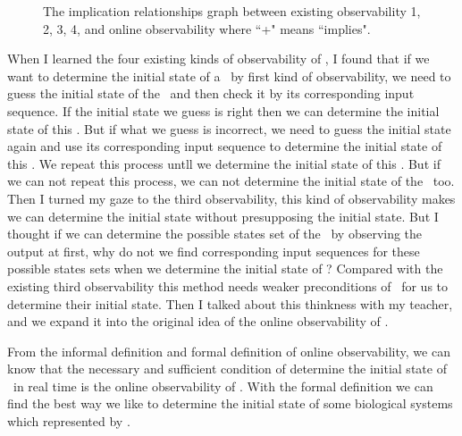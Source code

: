 \begin{figure}[thpb]
      \centering
      
      \caption{The implication relationships graph between existing observability 1, 2, 3, 4, and online observability where ``+" means ``implies".}
      \label{fig:7}
   \end{figure}
When I learned the four existing kinds of observability of \BCNs, I found that if we want to determine the initial state of a \BCN\ by first kind of observability, we need to guess the initial state of the \BCN\ and then check it by its corresponding input sequence. If the initial state we guess is right then we can determine the initial state of this \BCN. But if what we guess is incorrect, we need to guess the initial state again and use its corresponding input sequence to determine the initial state of this \BCN. We repeat this process untll we determine the initial state of this \BCN. But if we can not repeat this process, we can not determine the initial state of the \BCN\ too. Then I turned my gaze to the third observability, this kind of observability makes we can determine the initial state without presupposing the initial state. But I thought if we can determine the possible states set of the \BCN\ by observing the output at first, why do not we find corresponding input sequences for these possible states sets when we determine the initial state of \BCN? Compared with the existing third observability this method needs weaker preconditions of \BCNs\ for us to determine their initial state. Then I talked about this thinkness with my teacher, and we expand it into the original idea of the online observability of \BCNs. 

From the informal definition and formal definition of online observability, we can know that the necessary and sufficient condition of determine the initial state of \BCNs\ in real time is the online observability of \BCNs. With the formal definition we can find the best way we like to determine the initial state of some biological systems which represented by \BCNs.
